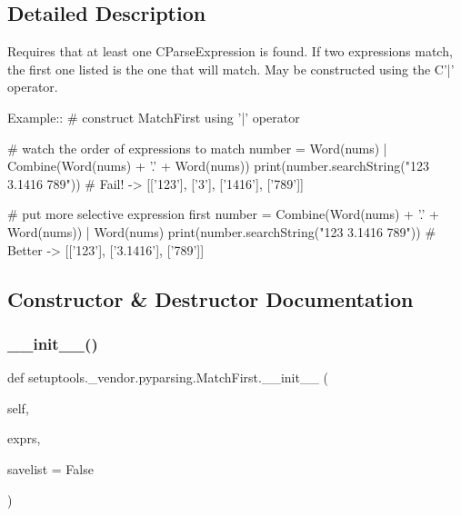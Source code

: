 \subsection{Detailed Description}
\begin{DoxyVerb}Requires that at least one C{ParseExpression} is found.
If two expressions match, the first one listed is the one that will match.
May be constructed using the C{'|'} operator.

Example::
    # construct MatchFirst using '|' operator
    
    # watch the order of expressions to match
    number = Word(nums) | Combine(Word(nums) + '.' + Word(nums))
    print(number.searchString("123 3.1416 789")) #  Fail! -> [['123'], ['3'], ['1416'], ['789']]

    # put more selective expression first
    number = Combine(Word(nums) + '.' + Word(nums)) | Word(nums)
    print(number.searchString("123 3.1416 789")) #  Better -> [['123'], ['3.1416'], ['789']]
\end{DoxyVerb}
 

\subsection{Constructor \& Destructor Documentation}
\mbox{\label{classsetuptools_1_1__vendor_1_1pyparsing_1_1MatchFirst_a8c4b94a7f8d215b1318450837ca995a7}} 
\subsubsection{\texorpdfstring{\+\_\+\+\_\+init\+\_\+\+\_\+()}{\_\_init\_\_()}}
{\footnotesize\ttfamily def setuptools.\+\_\+vendor.\+pyparsing.\+Match\+First.\+\_\+\+\_\+init\+\_\+\+\_\+ (\begin{DoxyParamCaption}\item[{}]{self,  }\item[{}]{exprs,  }\item[{}]{savelist = {\ttfamily False} }\end{DoxyParamCaption})}



